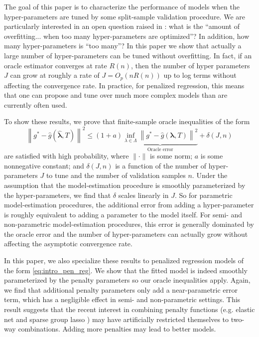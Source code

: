 \documentclass[12pt]{article} %
\theoremstyle{definition}
\begin{document}
The goal of this paper is to characterize the performance of models when the hyper-parameters are tuned by some split-sample validation procedure. We are particularly interested in an open question raised in \citet{bengio2000gradient}: what is the ``amount of overfitting... when too many hyper-parameters are optimized''? In addition, how many hyper-parameters is ``too many''? In this paper we show that actually a large number of hyper-parameters can be tuned without overfitting. In fact, if an oracle estimator converges at rate $R(n)$, then the number of hyper parameters $J$ can grow at roughly a rate of $J = O_p(nR(n))$ up to log terms without affecting the convergence rate. In practice, for penalized regression, this means that one can propose and tune over much more complex models than are currently often used.

To show these results, we prove that finite-sample oracle inequalities of the form
\begin{equation}
\label{thrm:intro_oracle_ineq}
\left \| g^* - \hat{g}\left (\hat{\boldsymbol{\lambda}}, T \right ) \right \|^2
\le
(1+a)
\underbrace{\inf_{\lambda \in \Lambda} \left \| g^* - \hat{g}\left (\boldsymbol{\lambda} , T \right ) \right \|^2}_{\text{Oracle error}}
+ \delta\left(J,n\right)
\end{equation}
are satisfied with high probability, where $\| \cdot \|$ is some norm;
$a$ is some nonnegative constant; and $\delta(J,n)$ is a function of the number of hyper-parameters $J$ to tune and the number of validation samples $n$.
Under the assumption that the model-estimation procedure is smoothly parameterized by the hyper-parameters, we find that $\delta$ scales linearly in $J$. So for parametric model-estimation procedures, the additional error from adding a hyper-parameter is roughly equivalent to adding a parameter to the model itself.
For semi- and non-parametric model-estimation procedures, this error is generally dominated by the oracle error and the number of hyper-parameters can actually grow without affecting the asymptotic convergence rate.

In this paper, we also specialize these results to penalized regression models of the form \eqref{eq:intro_pen_reg}. We show that the fitted model is indeed smoothly parameterized by the penalty parameters so our oracle inequalities apply. Again, we find that additional penalty parameters only add a near-parametric error term, which has a negligible effect in semi- and non-parametric settings. This result suggests that the recent interest in combining penalty functions (e.g. elastic net and sparse group lasso \citep{zou2003regression, simon2013sparse}) may have artificially restricted themselves to two-way combinations. Adding more penalties may lead to better models.
\end{document}
